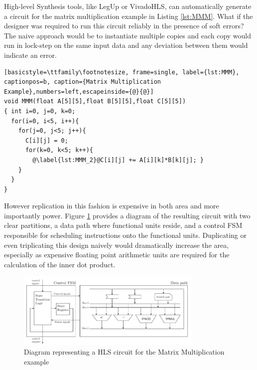 \providecommand*{\lstnumberautorefname}{line}

High-level Synthesis tools, like LegUp or VivadoHLS, can automatically generate a circuit
for the matrix multiplication example in Listing \ref{lst:MMM}.
What if the designer was required to run this circuit reliably in the
presence of soft errors? 
The naive approach would be to instantiate multiple copies and each copy would run in lock-step
on the same input data and any deviation between them would indicate an error.

\lstset{language=C}
\begin{lstlisting}[basicstyle=\ttfamily\footnotesize, frame=single, label={lst:MMM}, captionpos=b, caption={Matrix Multiplication Example},numbers=left,escapeinside={@}{@}]
void MMM(float A[5][5],float B[5][5],float C[5][5])
{ int i=0, j=0, k=0;
  for(i=0, i<5, i++){
    for(j=0, j<5; j++){
      C[i][j] = 0;
      for(k=0, k<5; k++){
        @\label{lst:MMM_2}@C[i][j] += A[i][k]*B[k][j]; }
    }
  }
}
\end{lstlisting}

However replication in this fashion is expensive in both area and more importantly
power. 
Figure \ref{fig:singleHLSArch} provides a diagram of the resulting
circuit with two clear partitions, a data path where functional units reside, and a
control FSM responsible for scheduling instructions onto the functional units. 
Duplicating or even triplicating this design naively would dramatically increase the
area, especially as expensive floating point arithmetic units are required for the
calculation of the inner dot product. 

\begin{figure}[h]
\centering
\includegraphics[width=3.5in]{./imgs/singleHLSArch.pdf}
\caption{Diagram representing a HLS circuit for the Matrix Multiplication example}
\label{fig:singleHLSArch}
\end{figure}

